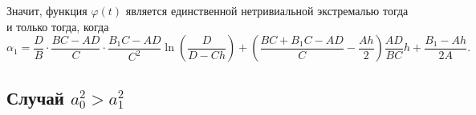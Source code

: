 \documentclass[a4paper,14pt]{article}
\begin{document}
Значит, функция $\varphi(t)$ является единственной нетривиальной экстремалью
тогда и только тогда, когда
\begin{equation*}
  \alpha_1
  =
  \frac{D}{B} \cdot
  \frac{B C - A D}{C} \cdot
  \frac{B_1 C - A D}{C^2}
  \ln \left( \frac{D}{D - C h} \right)
  +
  \left( \frac{B C + B_1 C - A D}{C} - \frac{A h }{2} \right)
  \frac{AD}{BC} h
  +
  \frac{B_1 - A h}{2 A}.
\end{equation*}


\newpage
\subsection{Случай $a_0^2 > a_1^2$}
\end{document}
